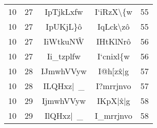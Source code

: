 \begin{longtable}{ | c | c || c | c | c | }
\hline
\hline
10 & 27 & IpTjkLxfw & I`iRzX\textbackslash \{w & 55 \\
10 & 27 & IpUKjL\}\^o & IqLck\textbackslash z\^o & 55 \\
\hline
10 & 27 & IiWtkuN\^W & IHtKlNr\^o & 56 \\
10 & 27 & Ii\_tzplfw & I`cnixl\{w & 56 \\
\hline
\hline
10 & 28 & IJmwhVVyw & I@h[z\^x|g & 57 \\
10 & 28 & ILQHxz|~\_ & I?mrrjnvo & 57 \\
\hline
\hline
10 & 29 & IjmwhVVyw & IKpX|\^x|g & 58 \\
10 & 29 & IlQHxz|~\_ & I\_mrrjnvo & 58 \\
\hline
\end{longtable}